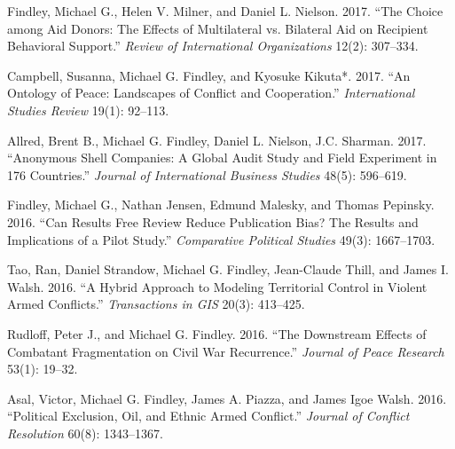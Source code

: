 \documentclass[10pt]{article}
\begin{document}
\begin{etaremune}
\item Findley, Michael G., Helen V. Milner, and Daniel L. Nielson. 2017. ``The Choice among Aid Donors: The Effects of Multilateral vs. Bilateral Aid on Recipient Behavioral Support.'' \textit{Review of International Organizations} 12(2): 307--334.

\item Campbell, Susanna, Michael G. Findley, and Kyosuke Kikuta*. 2017. ``An Ontology of Peace: Landscapes of Conflict and Cooperation.'' \textit{International Studies Review} 19(1): 92--113.

\item Allred, Brent B., Michael G. Findley, Daniel L. Nielson, J.C. Sharman. 2017. ``Anonymous Shell Companies: A Global Audit Study and Field Experiment in 176 Countries.'' \textit{Journal of International Business Studies} 48(5): 596--619.


\item Findley, Michael G., Nathan Jensen, Edmund Malesky, and Thomas Pepinsky. 2016. ``Can Results Free Review Reduce Publication Bias? The Results and Implications of a Pilot Study.'' \textit{Comparative Political Studies} 49(3): 1667--1703.



\item Tao, Ran, Daniel Strandow, Michael G. Findley, Jean-Claude Thill, and James I. Walsh. 2016. ``A Hybrid Approach to Modeling Territorial Control in Violent Armed Conflicts.'' \textit{Transactions in GIS} 20(3): 413--425.


\item Rudloff, Peter J., and Michael G. Findley. 2016. ``The Downstream Effects of Combatant Fragmentation on Civil War Recurrence.'' \textit{Journal of Peace Research} 53(1): 19--32.


\item Asal, Victor, Michael G. Findley, James A. Piazza, and James Igoe Walsh. 2016. ``Political Exclusion, Oil, and Ethnic Armed Conflict.'' \textit{Journal of Conflict Resolution} 60(8): 1343--1367.



\end{etaremune}
\end{document}
